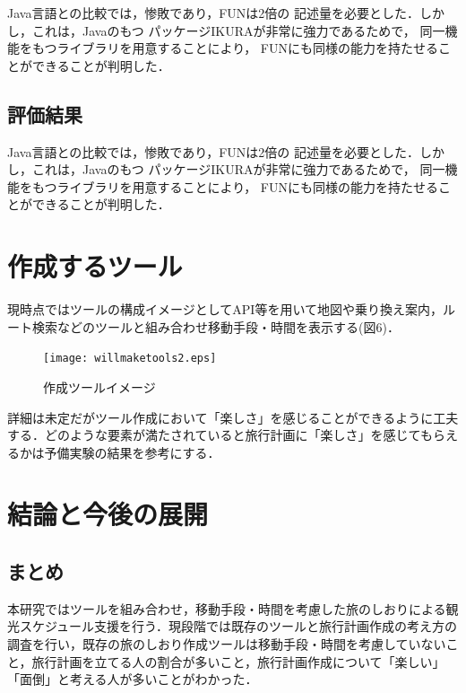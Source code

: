 \documentclass{funthesis}
\begin{document}
Java言語との比較では，惨敗であり，FUNは2倍の
記述量を必要とした．しかし，これは，Javaのもつ
パッケージIKURAが非常に強力であるためで，
同一機能をもつライブラリを用意することにより，
FUNにも同様の能力を持たせることができることが判明した．

\section{評価結果}

Java言語との比較では，惨敗であり，FUNは2倍の
記述量を必要とした．しかし，これは，Javaのもつ
パッケージIKURAが非常に強力であるためで，
同一機能をもつライブラリを用意することにより，
FUNにも同様の能力を持たせることができることが判明した．

\chapter{作成するツール}%

現時点ではツールの構成イメージとしてAPI等を用いて地図や乗り換え案内，ルート検索などのツールと組み合わせ移動手段・時間を表示する(図6)．
\begin{figure}[htpb]
\begin{center}
\texttt{[image: willmaketools2.eps]}
\caption{作成ツールイメージ}
\end{center}
\end{figure}

詳細は未定だがツール作成において「楽しさ」を感じることができるように工夫する．どのような要素が満たされていると旅行計画に「楽しさ」を感じてもらえるかは予備実験の結果を参考にする．\\

\chapter{結論と今後の展開}%

\section{まとめ}

本研究ではツールを組み合わせ，移動手段・時間を考慮した旅のしおりによる観光スケジュール支援を行う．現段階では既存のツールと旅行計画作成の考え方の調査を行い，既存の旅のしおり作成ツールは移動手段・時間を考慮していないこと，旅行計画を立てる人の割合が多いこと，旅行計画作成について「楽しい」「面倒」と考える人が多いことがわかった．\\
\end{document}
